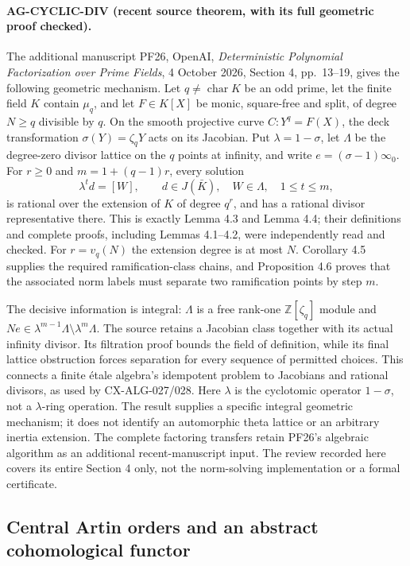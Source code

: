 \paragraph{AG-CYCLIC-DIV (recent source theorem, with its full geometric proof checked).}
The additional manuscript PF26, OpenAI,
\emph{Deterministic Polynomial Factorization over Prime Fields},
4 October 2026, Section 4, pp.~13--19, gives the following
geometric mechanism. Let $q\ne\operatorname{char}K$ be an odd
prime, let the finite field $K$ contain $\mu_q$, and let
$F\in K[X]$ be monic, square-free and split, of degree
$N\ge q$ divisible by $q$. On the smooth projective curve
$C:Y^q=F(X)$, the deck transformation $\sigma(Y)=\zeta_qY$
acts on its Jacobian. Put $\lambda=1-\sigma$, let $\Lambda$
be the degree-zero divisor lattice on the $q$ points at infinity,
and write $e=(\sigma-1)\infty_0$.
For $r\ge0$ and $m=1+(q-1)r$, every solution
\[
 \lambda^t d=[W],\qquad d\in J(\bar K),\quad
 W\in\Lambda,\quad 1\le t\le m,
\]
is rational over the extension of $K$ of degree $q^r$, and
has a rational divisor representative there. This is exactly
Lemma 4.3 and Lemma 4.4; their definitions and complete proofs,
including Lemmas 4.1--4.2, were independently read and checked.
For $r=v_q(N)$ the extension degree is at most $N$.
Corollary 4.5 supplies the required ramification-class chains,
and Proposition 4.6 proves that the associated norm labels
must separate two ramification points by step $m$.

The decisive information is integral: $\Lambda$ is a free
rank-one $\mathbb Z[\zeta_q]$ module and
$Ne\in\lambda^{m-1}\Lambda\setminus\lambda^m\Lambda$.
The source retains a Jacobian class together with its actual
infinity divisor. Its filtration proof bounds the field of
definition, while its final lattice obstruction forces
separation for every sequence of permitted choices. This
connects a finite \'etale algebra's idempotent problem to
Jacobians and rational divisors, as used by CX-ALG-027/028.
Here $\lambda$ is the cyclotomic operator $1-\sigma$, not
a $\lambda$-ring operation. The result supplies a specific
integral geometric mechanism; it does not identify an
automorphic theta lattice or an arbitrary inertia extension.
The complete factoring transfers retain PF26's algebraic
algorithm as an additional recent-manuscript input. The
review recorded here covers its entire Section 4 only, not
the norm-solving implementation or a formal certificate.

\subsection{Central Artin orders and an abstract cohomological functor}

